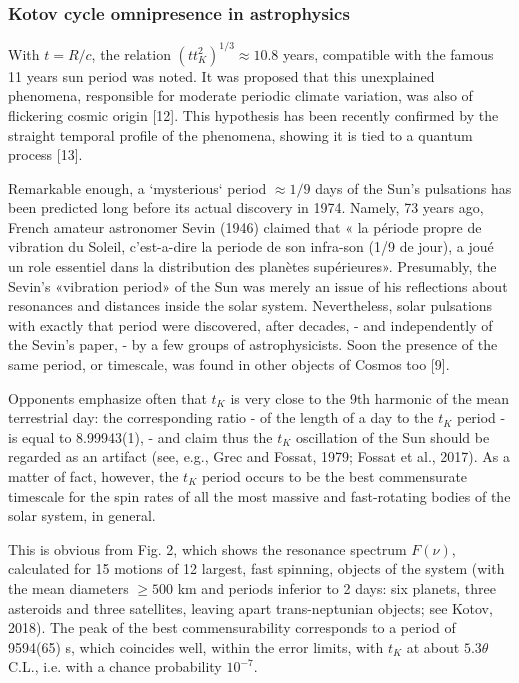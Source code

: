 \documentclass[twoside,draft]{article}
\begin{document}
\begin{sloppypar}
{\subsubsection{Kotov cycle omnipresence in astrophysics}

With $t = R/c$, the relation $(t t_{K}^2)^{1/3} \approx 10.8$ years, compatible with the famous 11 years sun period
was noted. It was proposed that this unexplained phenomena, responsible for moderate periodic
climate variation, was also of flickering cosmic origin [12]. This hypothesis has been recently
confirmed by the straight temporal profile of the phenomena, showing it is tied to a quantum
process [13].

Remarkable enough, a `mysterious` period $\approx 1/9$ days of the Sun's pulsations has been predicted
long before its actual discovery in 1974. Namely, 73 years ago, French amateur astronomer Sevin
(1946) claimed that « la p\'{e}riode propre de vibration du Soleil, c'est-a-dire la periode de son infra-son (1/9 de jour), a jou\'{e} un role essentiel dans la distribution des plan\`{e}tes sup\'{e}rieures». Presumably,
the Sevin's «vibration period» of the Sun was merely an issue of his reflections about resonances
and distances inside the solar system. Nevertheless, solar pulsations with exactly that period were
discovered, after decades, - and independently of the Sevin's paper, - by a few groups of
astrophysicists. Soon the presence of the same period, or timescale, was found in other objects of
Cosmos too [9].

Opponents emphasize often that $t_{K}$ is very close to the 9th harmonic of the mean terrestrial day: the corresponding ratio - of the length of a day to the $t_{K}$ period - is equal to 8.99943(1), - and claim
thus the $t_{K}$ oscillation of the Sun should be regarded as an artifact (see, e.g., Grec and Fossat, 1979;
Fossat et al., 2017). As a matter of fact, however, the $t_{K}$ period occurs to be the best commensurate
timescale for the spin rates of all the most massive and fast-rotating bodies of the solar system, in
general.

This is obvious from Fig. 2, which shows the resonance spectrum $F( \nu )$, calculated for 15
motions of 12 largest, fast spinning, objects of the system (with the mean diameters $\geq 500$ km and
periods inferior to 2 days: six planets, three asteroids and three satellites, leaving apart trans-neptunian
objects; see Kotov, 2018). The peak of the best commensurability corresponds to a period of
9594(65) s, which coincides well, within the error limits, with $t_K$ at about $5.3 \theta$ C.L., i.e. with a
chance probability $10^{-7}$.

}
\end{sloppypar}
\end{document}
